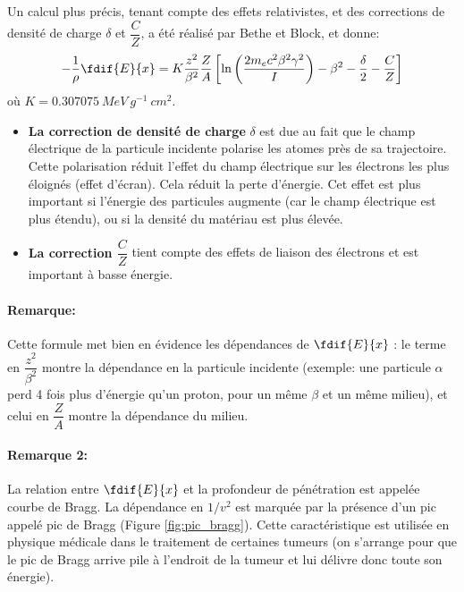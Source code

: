 Un calcul plus précis, tenant compte des effets relativistes, et des corrections de densité de charge $\delta$ et $\dfrac{C}{Z}$, a été réalisé par Bethe et Block, et donne:
\[
-\dfrac{1}{\rho}\fdif{E}{x} = K\dfrac{z^2}{\beta^2}\dfrac{Z}{A} \left[\ln\left(\dfrac{2m_ec^2\beta^2\gamma^2}{I}\right) - \beta^2-\dfrac{\delta}{2} -\dfrac{C}{Z}\right]
\]
où $K=0.307075~MeV~g^{-1}~cm^2$.

\begin{itemize}[label=$\longrightarrow$]
    \item \textbf{La correction de densité de charge} $\delta$ est due au fait que le champ électrique de la particule incidente polarise les atomes près de sa trajectoire. Cette polarisation réduit l'effet du champ électrique sur les électrons les plus éloignés (effet d'écran). Cela réduit la perte d'énergie. Cet effet est plus important si l'énergie des particules augmente (car le champ électrique est plus étendu), ou si la densité du matériau est plus élevée.
    \item \textbf{La correction $\dfrac{C}{Z}$} tient compte des effets de liaison des électrons et est important à basse énergie.
\end{itemize}

\paragraph{Remarque:} Cette formule met bien en évidence les dépendances de $\fdif{E}{x}$ : le terme en $\dfrac{z^2}{\beta^2}$ montre la dépendance en la particule incidente (exemple: une particule $\alpha$ perd 4 fois plus d'énergie qu'un proton, pour un même $\beta$ et un même milieu), et celui en $\dfrac{Z}{A}$ montre la dépendance du milieu.

\paragraph{Remarque 2:} La relation entre $\fdif{E}{x}$ et la profondeur de pénétration est appelée courbe de Bragg. La dépendance en $1/v^2$ est marquée par la présence d'un pic appelé pic de Bragg (Figure \ref{fig:pic_bragg}). Cette caractéristique est utilisée en physique médicale dans le traitement de certaines tumeurs (on s'arrange pour que le pic de Bragg arrive pile à l'endroit de la tumeur et lui délivre donc toute son énergie).




